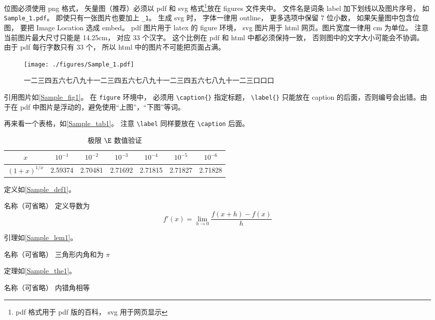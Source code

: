 位图必须使用 png 格式， 矢量图（推荐）必须以 pdf 和 svg 格式\footnote{pdf 格式用于 pdf 版的百科， svg 用于网页显示}放在 figures 文件夹中。 文件名是词条 label 加下划线以及图片序号， 如 \verb|Sample_1.pdf|。 即使只有一张图片也要加上 \verb|_1|。 生成 svg 时， 字体一律用 outline， 更多选项中保留 7 位小数， 如果矢量图中包含位图， 要把 Image Location 选成 embed。 pdf 图片用于 latex 的 figure 环境， svg 图片用于 html 网页。图片宽度一律用 cm 为单位。 注意当前图片最大尺寸只能是 14.25cm， 对应 33 个汉字。 这个比例在 pdf 和 html 中都必须保持一致， 否则图中的文字大小可能会不协调。 由于 pdf 每行字数只有 33 个， 所以 html 中的图片不可能把页面占满。
\begin{figure}[ht]
\centering
\texttt{[image: ./figures/Sample\_1.pdf]}
\caption{一二三四五六七八九十一二三四五六七八九十一二三四五六七八九十一二三口口口} \label{Sample_fig1}
\end{figure}
引用图片如\autoref{Sample_fig1}。 在 \verb|figure| 环境中， 必须用 \verb|\caption{}| 指定标题， \verb|\label{}| 只能放在 caption 的后面，否则编号会出错。由于在 pdf 中图片是浮动的，避免使用“上图”，“下图”等词。

再来看一个表格，如\autoref{Sample_tab1}。 注意 \verb|\label| 同样要放在 \verb|\caption| 后面。
\begin{table}[ht]
\centering
\caption{极限 $\E$ 数值验证}\label{Sample_tab1}
\begin{tabular}{|c|c|c|c|c|c|c|}
\hline
$x$ & ${10^{ - 1}}$ & ${10^{ - 2}}$ & ${10^{ - 3}}$ & ${10^{ - 4}}$ & ${10^{ - 5}}$ & ${10^{ - 6}}$ \\
\hline
$(1 + x)^{1/x}$ & 2.59374 & 2.70481 & 2.71692 & 2.71815 & 2.71827 & 2.71828 \\
\hline
\end{tabular}
\end{table}

定义如\autoref{Sample_def1}。
\begin{definition}{名称（可省略）}\label{Sample_def1}
定义导数为
\begin{equation}
f'(x) = \lim_{h \to 0} \frac{f(x + h) - f(x)}{h}
\end{equation}
\end{definition}

引理如\autoref{Sample_lem1}。
\begin{lemma}{名称（可省略）}\label{Sample_lem1}
三角形内角和为 $\pi$
\end{lemma}

定理如\autoref{Sample_the1}。
\begin{theorem}{名称（可省略）}\label{Sample_the1}
内错角相等
\end{theorem}

